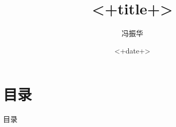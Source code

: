 \documentclass[a4paper,fontset = windows,aspectratio=169,9pt ]{ctexbeamer}
\title{<+title+>}
\author{ 冯振华\inst{1,2} }
\institute[BNU]%
{
    \inst{1} 北京师范大学，物理与天文学院
    \inst{2} 淄博实验中学，物理组
}
\date{<+date+>}
\begin{document}
\frame{\titlepage}

\section{目录}
\begin{frame}{目录}
    \begin{columns}[t]
        \begin{column}{.48\textwidth}
            \tableofcontents[sections={1-4}] %
        \end{column}
        \begin{column}{.48\textwidth}
            \tableofcontents[sections={5-8}] %
        \end{column}
    \end{columns}
\end{frame}
\end{document}
